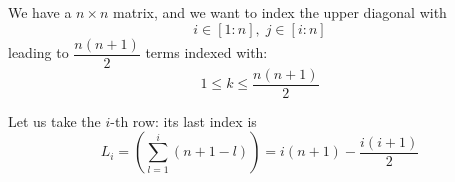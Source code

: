 \documentclass[aps,12pt]{revtex4}
\begin{document}
We have a $n \times n$ matrix, and we want to index the upper diagonal with
 $$i \in [1:n],\; j \in [i:n]$$
leading to $\dfrac{n(n+1)}{2}$ terms indexed with:
$$
	1 \leq k \leq \dfrac{n(n+1)}{2}
$$

Let us take the $i$-th row: its last index is
\begin{equation}
L_i = \left(\sum_{l=1}^i (n+1-l)\right)  = i(n+1) - \dfrac{i(i+1)}{2}
\end{equation}
\end{document}
